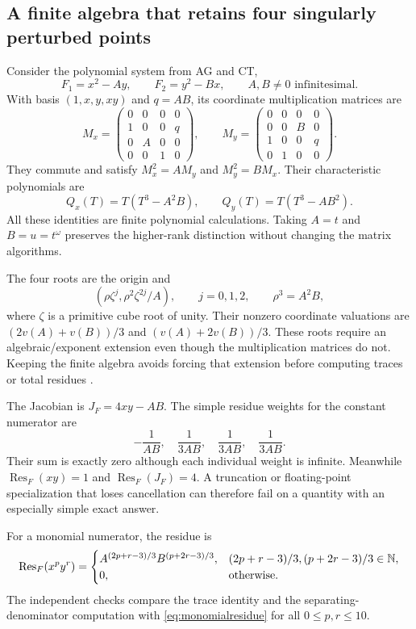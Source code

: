 \documentclass[11pt,letterpaper]{article}
\theoremstyle{definition}\newtheorem{definition}[theorem]{Definition}
\theoremstyle{remark}\newtheorem{remark}[theorem]{Remark}
\newcommand{\Res}{\operatorname{Res}}\newcommand{\res}{\operatorname{res}}
\numberwithin{equation}{section}\setcounter{tocdepth}{2}
\begin{document}
\subsection{A finite algebra that retains four singularly perturbed points}
Consider the polynomial system from AG and CT,
\begin{equation}\label{eq:fourexample}
 F_1=x^2-Ay,\qquad F_2=y^2-Bx,
 \qquad A,B\ne0\text{ infinitesimal}.
\end{equation}
With basis $(1,x,y,xy)$ and $q=AB$, its coordinate multiplication matrices are
\begin{equation}\label{eq:fourmatrices}
 M_x=\begin{pmatrix}0&0&0&0\\1&0&0&q\\0&A&0&0\\0&0&1&0\end{pmatrix},
 \qquad
 M_y=\begin{pmatrix}0&0&0&0\\0&0&B&0\\1&0&0&q\\0&1&0&0\end{pmatrix}.
\end{equation}
They commute and satisfy $M_x^2=AM_y$ and $M_y^2=BM_x$. Their characteristic polynomials are
\[
 Q_x(T)=T(T^3-A^2B),\qquad
 Q_y(T)=T(T^3-AB^2).
\]
All these identities are finite polynomial calculations. Taking $A=t$ and $B=u=t^\omega$ preserves the higher-rank distinction without changing the matrix algorithms.

The four roots are the origin and
\[
 (\rho\zeta^j,\rho^2\zeta^{2j}/A),\qquad
 j=0,1,2,\qquad \rho^3=A^2B,
\]
where $\zeta$ is a primitive cube root of unity. Their nonzero coordinate valuations are $(2v(A)+v(B))/3$ and $(v(A)+2v(B))/3$. These roots require an algebraic/exponent extension even though the multiplication matrices do not. Keeping the finite algebra avoids forcing that extension before computing traces or total residues \cite{AG,CT}.

The Jacobian is $J_F=4xy-AB$. The simple residue weights for the constant numerator are
\[
 -\frac1{AB},\quad\frac1{3AB},\quad\frac1{3AB},\quad\frac1{3AB}.
\]
Their sum is exactly zero although each individual weight is infinite. Meanwhile $\Res_F(xy)=1$ and $\Res_F(J_F)=4$. A truncation or floating-point specialization that loses cancellation can therefore fail on a quantity with an especially simple exact answer.

For a monomial numerator, the residue is
\begin{equation}\label{eq:monomialresidue}
 \Res_F(x^p y^r)=
 \begin{cases}
 A^{(2p+r-3)/3}B^{(p+2r-3)/3},&
 (2p+r-3)/3,(p+2r-3)/3\in\N,\\
 0,&\text{otherwise}.
 \end{cases}
\end{equation}
The independent checks compare the trace identity and the separating-denominator computation with \eqref{eq:monomialresidue} for all $0\le p,r\le10$.
\end{document}
